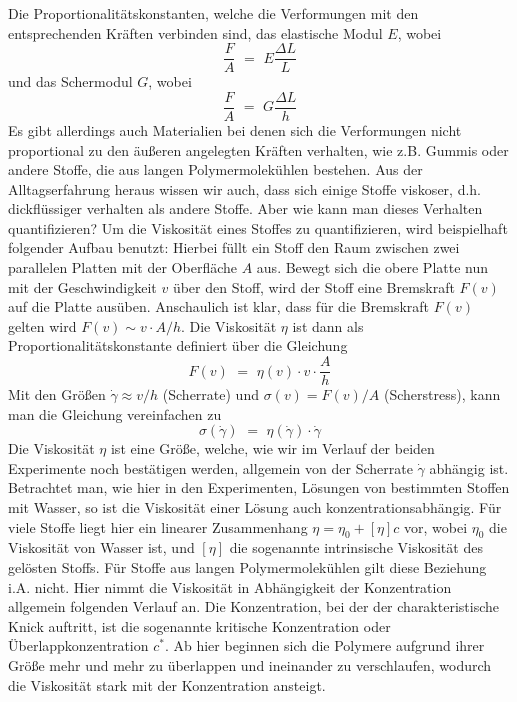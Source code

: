 \documentclass[11pt,a4paper,oneside]{scrartcl}
\begin{document}
Die Proportionalitätskonstanten, welche die Verformungen mit den entsprechenden Kräften verbinden sind, das elastische
Modul $E$, wobei
\begin{equation}
\frac{F}{A} \,\,=\,\, E \frac{\Delta L}{L}
\end{equation}
und das Schermodul $G$, wobei
\begin{equation}
\frac{F}{A} \,\,=\,\, G \frac{\Delta L}{h}
\end{equation}
Es gibt allerdings auch Materialien bei denen sich die Verformungen nicht proportional zu den äußeren angelegten Kräften verhalten, wie z.B. Gummis oder andere Stoffe, die aus langen Polymermolekühlen
bestehen.
Aus der Alltagserfahrung heraus wissen wir auch, dass sich einige Stoffe viskoser, d.h. dickflüssiger verhalten als andere Stoffe. Aber wie kann man dieses Verhalten quantifizieren?
Um die Viskosität eines Stoffes zu quantifizieren, wird beispielhaft folgender Aufbau benutzt: 
Hierbei füllt ein Stoff den Raum zwischen zwei parallelen Platten mit der Oberfläche $A$ aus.
Bewegt sich die obere Platte nun mit der Geschwindigkeit $v$ über den Stoff, wird der Stoff eine Bremskraft $F(v)$ auf die Platte ausüben. Anschaulich ist klar, dass für
die Bremskraft $F(v)$ gelten wird $F(v) \sim v \cdot A/h$. Die Viskosität $\eta$ ist dann als Proportionalitätskonstante definiert über die Gleichung
\begin{equation}
F(v) \,\,=\,\, \eta (v) \cdot v \cdot \frac{A}{h}
\end{equation}
Mit den Größen $\dot{\gamma} \approx v/h$ (Scherrate) und $\sigma(v) = F(v)/A$ (Scherstress), kann man die Gleichung vereinfachen zu
\begin{equation}
\sigma(\dot{\gamma}) \,\,=\,\, \eta (\dot{\gamma}) \cdot \dot{\gamma} 
\end{equation}
Die Viskosität $\eta$ ist eine Größe, welche, wie wir im Verlauf der beiden Experimente noch bestätigen werden, allgemein von der Scherrate $\dot\gamma$ abhängig ist.\\
Betrachtet man, wie hier in den Experimenten, Lösungen von bestimmten Stoffen mit Wasser, so ist die Viskosität einer Lösung auch konzentrationsabhängig. Für viele Stoffe liegt hier ein linearer
Zusammenhang $\eta = \eta_0 + [\eta]c$ vor, wobei $\eta_0$ die Viskosität von Wasser ist, und $[\eta]$ die sogenannte intrinsische Viskosität des gelösten Stoffs.
Für Stoffe aus langen Polymermolekühlen gilt diese Beziehung i.A. nicht. Hier nimmt die Viskosität in Abhängigkeit der Konzentration allgemein folgenden Verlauf an.
 Die Konzentration, bei der 
der charakteristische Knick auftritt, ist die sogenannte kritische Konzentration oder Überlappkonzentration $c^{*}$. Ab hier beginnen sich die Polymere aufgrund ihrer Größe mehr und mehr zu überlappen und ineinander zu verschlaufen, wodurch die Viskosität stark mit der Konzentration ansteigt.
\end{document}
